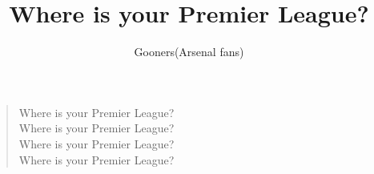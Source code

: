 \documentclass[a4paper,12pt]{article}
\title{Where is your Premier League?}
\author{Gooners(Arsenal fans)}
\date{}
\begin{document}
	
	\maketitle
	
	\begin{verse}
		
		Where is your Premier League? \\
		Where is your Premier League? \\
		Where is your Premier League? \\
		Where is your Premier League?
		
	\end{verse}
	
\end{document}
